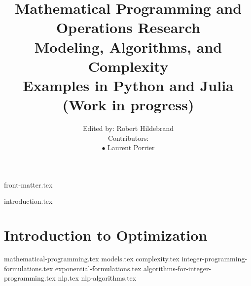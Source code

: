 \documentclass[letter,11pt]{book}
\title{ \textbf{Mathematical Programming and Operations Research}\\ Modeling, Algorithms, and Complexity\\
 Examples in Python and Julia\\
 (Work in progress)}
\author{Edited by: Robert Hildebrand\\
 Contributors:\hspace{10cm} \\
 $\bullet$ Laurent Porrier \\
  }
\begin{document}
{front-matter.tex}
\tableofcontents

{introduction.tex}

\part{Introduction to Optimization}
{mathematical-programming.tex}
{models.tex}
{complexity.tex}
{integer-programming-formulations.tex}
{exponential-formulations.tex}
{algorithms-for-integer-programming.tex}
{nlp.tex}
{nlp-algorithms.tex}



\end{document}
